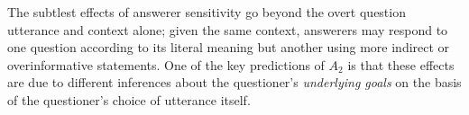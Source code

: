 \documentclass[12pt, floatsintext, jou]{apa6}
\begin{document}

The subtlest effects of answerer sensitivity go beyond the overt question utterance and context alone; given the same context, answerers may respond to one question according to its literal meaning but another using more indirect or overinformative statements. One of the key predictions of  $A_2$ is that these effects are due to different inferences about the questioner's \emph{underlying goals} on the basis of the questioner's choice of utterance itself. 
\end{document}
